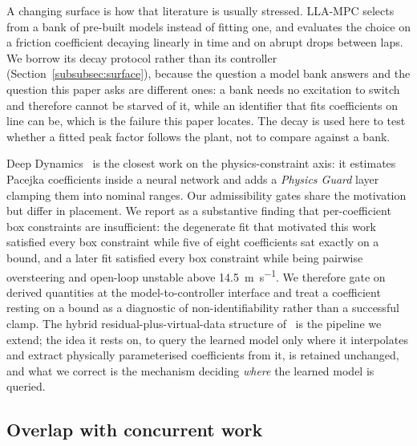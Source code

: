 A changing surface is how that literature is usually stressed. LLA-MPC
\cite{llampc2025} selects from a bank of pre-built models instead of fitting
one, and evaluates the choice on a friction coefficient decaying linearly in
time and on abrupt drops between laps. We borrow its decay protocol rather than
its controller (Section~\ref{subsubsec:surface}), because the question a model
bank answers and the question this paper asks are different ones: a bank needs
no excitation to switch and therefore cannot be starved of it, while an
identifier that fits coefficients on line can be, which is the failure this
paper locates. The decay is used here to test whether a fitted peak factor
follows the plant, not to compare against a bank.

Deep Dynamics~\cite{deepdynamics2024} is the closest work on the
physics-constraint axis: it estimates Pacejka coefficients inside a neural
network and adds a \emph{Physics Guard} layer clamping them into nominal ranges.
Our admissibility gates share the motivation but differ in placement. We report
as a substantive finding that per-coefficient box constraints are
insufficient: the degenerate fit that motivated this work satisfied every
box constraint while five of eight coefficients sat exactly on a bound, and a
later fit satisfied every box constraint while being pairwise oversteering and
open-loop unstable above \SI{14.5}{\meter\per\second}. We therefore gate on
derived quantities at the model-to-controller interface and treat a coefficient
resting on a bound as a diagnostic of non-identifiability rather than a
successful clamp. The hybrid residual-plus-virtual-data structure
of~\cite{ontrack2025} is the pipeline we extend; the idea it rests on, to query
the learned model only where it interpolates and extract physically
parameterised coefficients from it, is retained unchanged, and what we correct
is the mechanism deciding \emph{where} the learned model is queried.

\subsection{Overlap with concurrent work}

